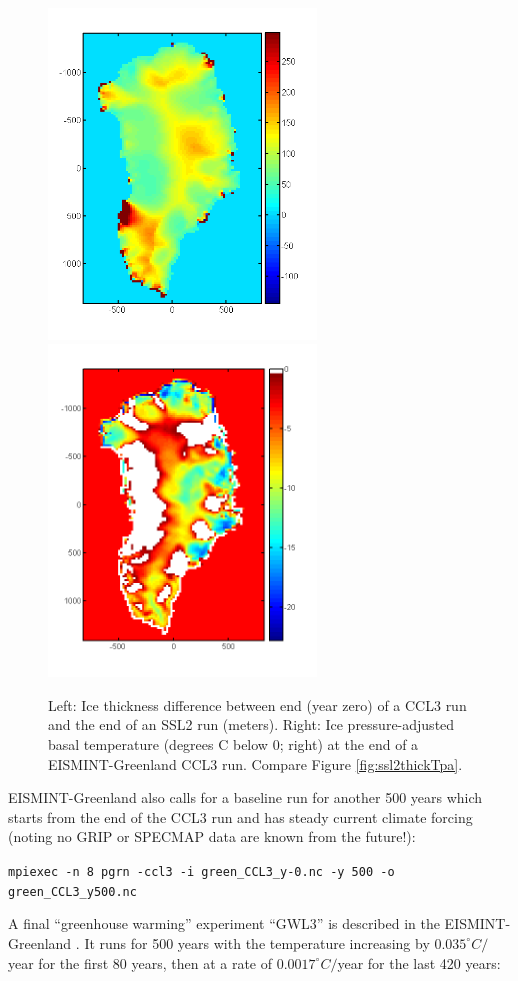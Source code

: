 \documentclass[11pt,final]{amsart}
\begin{document}
\begin{figure}[h]
\includegraphics[width=2.8in]{Hdiff_CCLSSL}\quad\includegraphics[width=2.8in]{Tpa_CCL}
\caption{Left:  Ice thickness difference between end (year zero) of a CCL3 run and the end of an SSL2 run (meters).  Right:  Ice pressure-adjusted basal temperature (degrees C below 0; right) at the end of a EISMINT-Greenland CCL3 run.  Compare Figure \ref{fig:ssl2thickTpa}.}
\label{fig:cclthickTpa}
\end{figure}

EISMINT-Greenland also calls for a baseline run for another 500 years which starts from the end of the CCL3 run and has steady current climate forcing (noting no GRIP or SPECMAP data are known from the future!):

\verb|mpiexec -n 8 pgrn -ccl3 -i green_CCL3_y-0.nc -y 500 -o green_CCL3_y500.nc|

A final ``greenhouse warming'' experiment ``GWL3'' is described in the EISMINT-Greenland \cite{RitzEISMINT}.  It runs for 500 years with the temperature increasing by $0.035^\circ C/$year for the first 80 years, then at a rate of $0.0017^\circ C/$year for the last 420 years:
\end{document}
